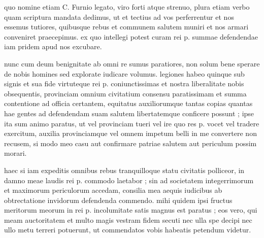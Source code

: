  quo nomine etiam C. Furnio legato, viro forti atque strenuo, plura etiam verbo quam scriptura mandata dedimus, ut et tectius ad vos perferrentur et nos essemus tutiores, quibusque rebus et communem salutem muniri et nos armari conveniret praecepimus. ex quo intellegi potest curam rei p. summae defendendae iam pridem apud nos excubare.

 nunc cum deum benignitate ab omni re sumus paratiores, non solum bene sperare de nobis homines sed explorate iudicare volumus. legiones habeo quinque sub signis et sua fide virtuteque rei p. coniunctissimas et nostra liberalitate nobis obsequentis, provinciam omnium civitatium consensu paratissimam et summa contentione ad officia certantem, equitatus auxiliorumque tantas copias quantas hae gentes ad defendendam suam salutem libertatemque conficere possunt ; ipse ita sum animo paratus, ut vel provinciam tueri vel ire quo res p. vocet vel tradere exercitum, auxilia provinciamque vel omnem impetum belli in me convertere non recusem, si modo meo casu aut confirmare patriae salutem aut periculum possim morari.

 haec si iam expeditis omnibus rebus tranquilloque statu civitatis polliceor, in damno meae laudis rei p. commodo laetabor ; sin ad societatem integerrimorum et maximorum periculorum accedam, consilia mea aequis iudicibus ab obtrectatione invidorum defendenda commendo. mihi quidem ipsi fructus meritorum meorum in rei p. incolumitate satis magnus est paratus ; eos vero, qui meam auctoritatem et multo magis vestram fidem secuti nec ulla spe decipi nec ullo metu terreri potuerunt, ut commendatos vobis habeatis petendum videtur.
